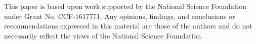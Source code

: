 \documentclass[sigconf]{acmart}
\begin{document}
\maketitle










\begin{acks}
This paper is based upon work supported by the National Science
Foundation under Grant No. CCF-1617771.
%
Any opinions, findings, and conclusions or recommendations expressed
in this material are those of the authors and do not necessarily
reflect the views of the National Science Foundation.
\end{acks}
  

%

\end{document}
